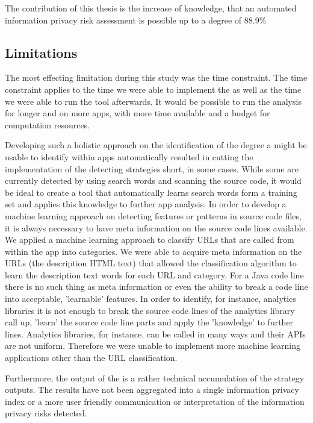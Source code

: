 The contribution of this thesis is the increase of knowledge, that an automated information privacy risk assessment is possible up to a degree of 88.9\%

\subsection{Limitations}\label{chapter:Limitations}

The most effecting limitation during this study was the time constraint.
The time constraint applies to the time we were able to implement the \aiprat as well as the time we were able to run the tool afterwards.
It would be possible to run the analysis for longer and on more apps, with more time available and a budget for computation resources.

Developing such a holistic approach on the identification of the degree a \sca might be usable to identify \ipr within \mH apps automatically resulted in cutting the implementation of the \ipr detecting strategies short, in some cases.
While some \ipr are currently detected by using search words and scanning the source code, it would be ideal to create a tool that automatically learns search words form a training set and applies this knowledge to further app analysis.
In order to develop a machine learning approach on detecting features or patterns in source code files, it is always necessary to have meta information on the source code lines available.
We applied a machine learning approach to classify URLs that are called from within the app into categories. 
We were able to acquire meta information on the URLs (the description HTML text) that allowed the classification algorithm to learn the description text words for each URL and category.
For a Java code line there is no such thing as meta information or even the ability to break a code line into acceptable, 'learnable' features.
In order to identify, for instance, analytics libraries it is not enough to break the source code lines of the analytics library call up, 'learn' the source code line parts and apply the 'knowledge' to further lines.
Analytics libraries, for instance, can be called in many ways and their \acs{API}s are not uniform.
Therefore we were unable to implement more machine learning applications other than the URL classification.

Furthermore, the output of the \aiprat is a rather technical accumulation of the \sca strategy outputs.
The results have not been aggregated into a single information privacy index or a more user friendly communication or interpretation of the information privacy risks detected.

